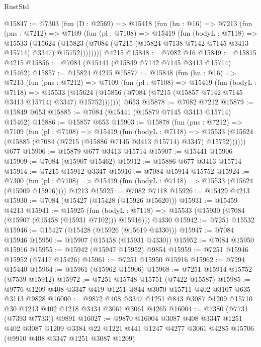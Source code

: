 \begin{lexlean}{RustStd}
\begin{coremodule}
@15847 := @7303
    (fun (D : @2569) =>
    @15418
      (fun (hn : @16) =>
      @7213
        (fun (pns : @7212) =>
        @7109
          (fun (pl : @7108) =>
          @15419
            (fun (bodyL : @7118) =>
            @15533
              (@15624
                (@15823 (@7084 (@7215 (@15824 @7138 @7142 @7145 @3413 @15714) @3347) @15752))))))))
    @4215
@15848 := @7082 @16
@15849 := @15815 @4215
@15856 := @7084 (@15441 (@15849 @7142 @7145 @3413 @15714) @15462)
@15857 := @15824 @4215
@15877 := @15848
    (fun (hn : @16) =>
    @7213
      (fun (pns : @7212) =>
      @7109
        (fun (pl : @7108) =>
        @15419
          (fun (bodyL : @7118) =>
          @15533
            (@15624 (@15856 (@7084 (@7215 (@15857 @7142 @7145 @3413 @15714) @3347) @15752)))))))
    @653
@15878 := @7082 @7212
@15879 := @15849 @653
@15885 := @7084 (@15441 (@15879 @7145 @3413 @15714) @15462)
@15886 := @15857 @653
@15903 := @15878
    (fun (pns : @7212) =>
    @7109
      (fun (pl : @7108) =>
      @15419
        (fun (bodyL : @7118) =>
        @15533 (@15624 (@15885 (@7084 (@7215 (@15886 @7145 @3413 @15714) @3347) @15752))))))
    @677
@15906 := @15879 @677 @3413 @15714
@15907 := @15441 @15906
@15909 := @7084 (@15907 @15462)
@15912 := @15886 @677 @3413 @15714
@15914 := @7215 @15912 @3347
@15916 := @7084 @15914 @15752
@15924 := @7300
    (fun (pl : @7108) => @15419 (fun (bodyL : @7118) => @15533 (@15624 (@15909 @15916))))
    @4213
@15925 := @7082 @7118
@15926 := @15429 @4213
@15930 := @7084 (@15427 (@15428 (@15926 @15620)))
@15931 := @15459 @4213
@15941 := @15925
    (fun (bodyL : @7118) => @15533 (@15930 (@7084 (@15907 (@15458 (@15931 @7102))) @15916)))
    @4330
@15942 := @7251 @15532
@15946 := @15427 (@15428 (@15926 (@15619 @4330)))
@15947 := @7084 @15946
@15950 := @15907 (@15458 (@15931 @4330))
@15952 := @7084 @15950 @15916
@15955 := @15942 (@15947 @15952) @9854
@15959 := @7251 @15946 @15952 (@7417 @15426)
@15961 := @7251 @15950 @15916
@15962 := @7294 @15440
@15964 := @15961 (@15962 @15906)
@15968 := @7251 @15914 @15752 (@7539 @15912)
@15972 := @7251 @15748 @15751 (@7422 @15587)
@15985 := @9776 @1209 @408 @3347 @419 @1251 @844 @3070 @15711 @402 @3107 @635 @3113 @9828
@16000 := @9872
    @408
    @3347
    @1251
    @843
    @3087
    @1209
    @15710
    @30
    @1213
    @402
    @1218
    @3434
    @3061
    @3061
    @4265
@16004 := @7380 (@7731 (@7393 @7733)) @9891
@16027 := @9870
    @16004
    @3087
    @408
    @3347
    @1251
    @402
    @3087
    @1209
    @3384
    @22
    @1221
    @441
    @1247
    @4277
    @3061
    @4285
    @15706
    (@9910 @408 @3347 @1251 @3087 @1209)

\end{coremodule}
\end{lexlean}
